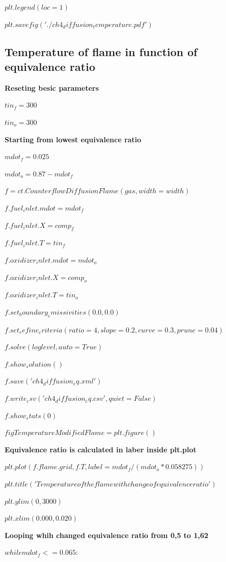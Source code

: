 \documentclass[a4paper]{article}
\begin{document}
\hspace{5,35mm}$    plt.legend(loc=1)$

$plt.savefig('./ch4_diffusion_temperature.pdf')$

\subsection{Temperature of flame in function of equivalence ratio}

\textbf{Reseting besic parameters}

$tin_f=300$

$tin_o=300$

\textbf{Starting from lowest equivalence ratio}

$mdot_f = 0.025$

$mdot_o = 0.87-mdot_f$

$f = ct.CounterflowDiffusionFlame(gas, width=width)$

$f.fuel_inlet.mdot = mdot_f$

$f.fuel_inlet.X = comp_f$

$f.fuel_inlet.T = tin_f$

$f.oxidizer_inlet.mdot = mdot_o$

$f.oxidizer_inlet.X = comp_o$

$f.oxidizer_inlet.T = tin_o$

$f.set_boundary_emissivities(0.0, 0.0)$

$f.set_refine_criteria(ratio=4, slope=0.2, curve=0.3, prune=0.04)$

$f.solve(loglevel, auto=True)$

$f.show_solution()$

$f.save('ch4_diffusion_eq.xml')$

$f.write_csv('ch4_diffusion_eq.csv', quiet=False)$

$f.show_stats(0)$

$figTemperatureModifiedFlame = plt.figure()$

\textbf{Equivalence ratio is calculated in laber inside plt.plot}

$plt.plot(f.flame.grid, f.T, label=mdot_f/(mdot_o*0.058275) )$

$plt.title('Temperature of the flame with change of equivalence ratio')$

$plt.ylim(0,3000)$

$plt.xlim(0.000, 0.020)$

\textbf{Looping whih changed equivalence ratio from 0,5 to 1,62}

$while mdot_f <= 0.065:$
\end{document}
